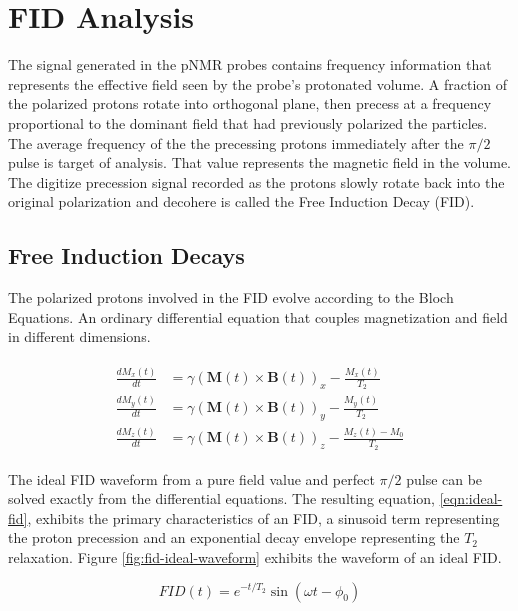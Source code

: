 \chapter{FID Analysis}

The signal generated in the pNMR probes contains frequency information that represents the effective field seen by the probe's protonated volume.  A fraction of the polarized protons rotate into orthogonal plane, then precess at a frequency proportional to the dominant field that had previously polarized the particles.  The average frequency of the the precessing protons immediately after the $\pi/2$ pulse is target of analysis.  That value represents the magnetic field in the volume.  The digitize precession signal recorded as the protons slowly rotate back into the original polarization and decohere is called the Free Induction Decay (FID).

\section{Free Induction Decays}

The polarized protons involved in the FID evolve according to the Bloch Equations.  An ordinary differential equation that couples magnetization and field in different dimensions.

\begin{align} 
\begin{split}
\label{eqn:fid-bloch}
\frac{dM_x(t)}{dt} & = \gamma (\mathbf{M}(t) \times \mathbf{B}(t))_x - \frac{M_x(t)}{T_2} \\
\frac{dM_y(t)}{dt} & = \gamma (\mathbf{M}(t)\times \mathbf{B}(t))_y - \frac{M_y(t)}{T_2} \\
\frac{dM_z(t)}{dt} & = \gamma (\mathbf{M}(t) \times \mathbf{B}(t))_z - \frac{M_z(t) - M_0}{T_2}
\end{split} 
\end{align}

The ideal FID waveform from a pure field value and perfect $\pi/2$ pulse can be solved exactly from the differential equations.  The resulting equation, \ref{eqn:ideal-fid}, exhibits the primary characteristics of an FID, a sinusoid term representing the proton precession and an exponential decay envelope representing the $T_2$ relaxation.  Figure \ref{fig:fid-ideal-waveform} exhibits the waveform of an ideal FID.

\begin{equation}
FID(t) = e^{-t/T_2} \sin(\omega t - \phi_0)
\label{eqn:ideal-fid}
\end{equation}

